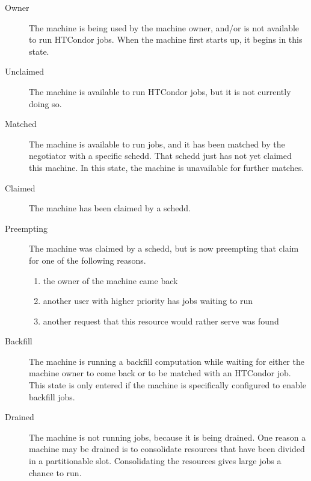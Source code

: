 \begin{description}
  
\item[Owner] The machine is being used by the machine owner, and/or
  is not available to run HTCondor jobs.
  When the machine first starts up, it begins in this state.
  
\item[Unclaimed] The machine is available to run HTCondor jobs, but it is
  not currently doing so.
  
\item[Matched] The machine is available to run jobs, and it has been
  matched by the negotiator with a specific schedd.
  That schedd just has not yet claimed this machine.
  In this state, the machine is unavailable for further matches.

\item[Claimed] The machine has been claimed by a schedd. 
  
\item[Preempting] The machine was claimed by a schedd, but is now
  preempting that claim for one of the following reasons.
  \begin{enumerate}
  \item the owner of the machine came back
  \item another user with higher priority has jobs waiting to run
  \item another request that this resource would rather serve was found
  \end{enumerate}

\item[Backfill] The machine is running a backfill computation while
  waiting for either the machine owner to come back or to be matched
  with an HTCondor job.
  This state is only entered if the machine is specifically configured
  to enable backfill jobs.

\item[Drained] The machine is not running jobs, because it is being
  drained.  One reason a machine may be drained is to consolidate
  resources that have been divided in a partitionable slot.
  Consolidating the resources gives large jobs a chance to run.

\end{description}


